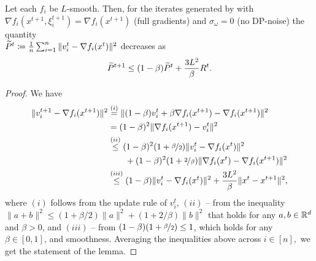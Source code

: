 \documentclass[a4paper,11pt]{article}
\begin{document}
\begin{lemma}\label{lem:descent_Pt_tilde}
    Let each $f_i$ be $L$-smooth. Then, for the iterates generated by  with $\nabla f_i(x^{t+1},\xi^{t+1}_i) = \nabla f_i(x^{t+1})$ (full gradients) and $\sigma_{\omega} = 0$ (no DP-noise) the quantity\\ $\widetilde{P}^t \coloneqq \frac{1}{n}\sum_{i=1}^n\|v_i^t - \nabla f_i(x^t)\|^2$ decreases as
    \begin{equation}
    \widetilde{P}^{t+1} \le (1-\beta)\widetilde{P}^t + \frac{3L^2}{\beta}R^t.
    \end{equation}
\end{lemma}
\begin{proof}
    We have 
    \begin{align*}
        \|v_i^{t+1} - \nabla f_i(x^{t+1})\|^2 
        &\overset{(i)}{=} \|(1-\beta)v_i^t + \beta\nabla f_i(x^{t+1}) - \nabla f_i(x^{t+1})\|^2\\
        &= (1-\beta)^2\|\nabla f_i(x^{t+1}) - v_i^t\|^2\\
        &\overset{(ii)}{\le} (1-\beta)^2(1+\nicefrac{\beta}{2})\|v_i^t - \nabla f_i(x^t)\|^2\\
        &\qquad + (1-\beta)^2(1+\nicefrac{2}{\beta})\|\nabla f_i(x^t) - \nabla f_i(x^{t+1})\|^2\\
        &\overset{(iii)}{\le} (1-\beta)\|v_i^t - \nabla f_i(x^t)\|^2
        + \frac{3L^2}{\beta}\|x^t - x^{t+1}\|^2,
    \end{align*}
    where $(i)$ follows from the update rule of $v_i^t$, $(ii)$ -- from the inequality $\|a+b\|^2\le(1+\beta/2)\|a\|^2 + (1+2/\beta)\|b\|^2$ that holds for any $a,b \in \mathbb{R}^d$ and $\beta > 0$, and $(iii)$ -- from $(1-\beta)(1+\nicefrac{\beta}{2})\leq 1$, which holds for any $\beta \in [0,1]$, and smoothness. Averaging the inequalities above across $i\in[n],$ we get the statement of the lemma.
\end{proof}
\end{document}
